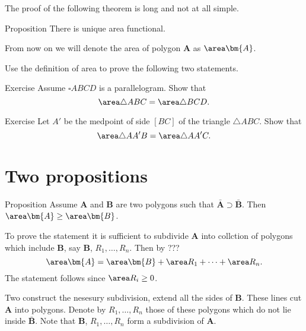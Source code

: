 The proof of the following theorem is long and not at all simple.

\begin{thm}{Proposition}
There is unique area functional.
\end{thm}

From now on we will denote the area of polygon $\bm{A}$ as $\area \bm{A}$.

Use the definition of area to prove the following two statements.


\begin{thm}{Exercise}
Assume $\square ABCD$ is a parallelogram.
Show that 
\[\area\triangle ABC=\area\triangle BCD.\]

\end{thm}

\begin{thm}{Exercise}
Let $A'$ be the medpoint of side $[BC]$ of the triangle $\triangle ABC$.
Show that 
\[\area\triangle AA'B=\area\triangle AA'C.\]

\end{thm}



















\section*{Two propositions}

\begin{thm}{Proposition}\label{prop:monotonicity-of-area}
Assume $\bm{A}$ and $\bm{B}$ are two polygons such that $\bar{\bm{A}}\supset \bar{\bm{B}}$.
Then $\area \bm{A}\ge \area \bm{B}$.
\end{thm}

To prove the statement it is sufficient to subdivide $\bm{A}$ into collction of polygons which include $\bm{B}$, say $\bm{B}$, $R_1,\dots,R_n$.
Then by ???
\[\area \bm{A}=\area \bm{B}+\area R_1+\dots +\area R_n.\]
The statement follows since $\area R_i\ge 0$.

Two construct the nesesury subdivision, extend all the sides of $\bm{B}$.
These lines cut $\bm{A}$ into polygons.
Denote by $R_1,\dots,R_n$ those of these polygons which do not lie inside $\bar{\bm{B}}$.
Note that $\bm{B}$, $R_1,\dots,R_n$ form a subdivision of $\bm{A}$.



